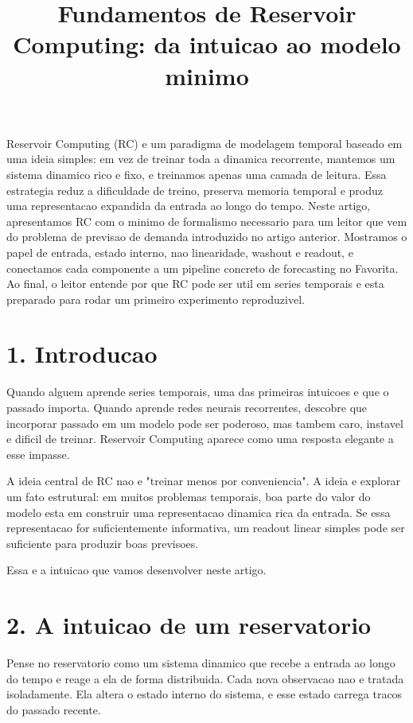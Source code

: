 \documentclass[12pt]{article}
\title{Fundamentos de Reservoir Computing: da intuicao ao modelo minimo}
\author{}
\begin{document}
\maketitle

\begin{resumo}
Reservoir Computing (RC) e um paradigma de modelagem temporal baseado em uma ideia simples: em vez de treinar toda a dinamica recorrente, mantemos um sistema dinamico rico e fixo, e treinamos apenas uma camada de leitura. Essa estrategia reduz a dificuldade de treino, preserva memoria temporal e produz uma representacao expandida da entrada ao longo do tempo. Neste artigo, apresentamos RC com o minimo de formalismo necessario para um leitor que vem do problema de previsao de demanda introduzido no artigo anterior. Mostramos o papel de entrada, estado interno, nao linearidade, washout e readout, e conectamos cada componente a um pipeline concreto de forecasting no Favorita. Ao final, o leitor entende por que RC pode ser util em series temporais e esta preparado para rodar um primeiro experimento reproduzivel.
\end{resumo}

\section{1. Introducao}\label{1-introducao}

Quando alguem aprende series temporais, uma das primeiras intuicoes e que o passado importa. Quando aprende redes neurais recorrentes, descobre que incorporar passado em um modelo pode ser poderoso, mas tambem caro, instavel e dificil de treinar. Reservoir Computing aparece como uma resposta elegante a esse impasse.

A ideia central de RC nao e "treinar menos por conveniencia". A ideia e explorar um fato estrutural: em muitos problemas temporais, boa parte do valor do modelo esta em construir uma representacao dinamica rica da entrada. Se essa representacao for suficientemente informativa, um readout linear simples pode ser suficiente para produzir boas previsoes.

Essa e a intuicao que vamos desenvolver neste artigo.

\section{2. A intuicao de um reservatorio}\label{2-a-intuicao-de-um-reservatorio}

Pense no reservatorio como um sistema dinamico que recebe a entrada ao longo do tempo e reage a ela de forma distribuida. Cada nova observacao nao e tratada isoladamente. Ela altera o estado interno do sistema, e esse estado carrega tracos do passado recente.
\end{document}

